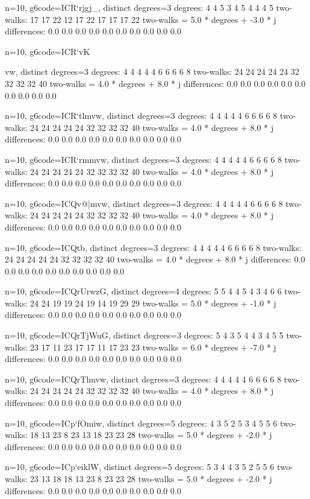 {{{{{{{{{{{{{{{{n=10, g6code=ICR`rjgj_, distinct degrees=3
degrees: 4 4 5 3 4 5 4 4 4 5 
two-walks: 17 17 22 12 17 22 17 17 17 22 
two-walks = 5.0 * degrees + -3.0 * j
differences: 0.0 0.0 0.0 0.0 0.0 0.0 0.0 0.0 0.0 0.0 

n=10, g6code=ICR`vK}vw, distinct degrees=3
degrees: 4 4 4 4 4 6 6 6 6 8 
two-walks: 24 24 24 24 24 32 32 32 32 40 
two-walks = 4.0 * degrees + 8.0 * j
differences: 0.0 0.0 0.0 0.0 0.0 0.0 0.0 0.0 0.0 0.0 

n=10, g6code=ICR`tlmvw, distinct degrees=3
degrees: 4 4 4 4 4 6 6 6 6 8 
two-walks: 24 24 24 24 24 32 32 32 32 40 
two-walks = 4.0 * degrees + 8.0 * j
differences: 0.0 0.0 0.0 0.0 0.0 0.0 0.0 0.0 0.0 0.0 

n=10, g6code=ICR`rmmvw, distinct degrees=3
degrees: 4 4 4 4 4 6 6 6 6 8 
two-walks: 24 24 24 24 24 32 32 32 32 40 
two-walks = 4.0 * degrees + 8.0 * j
differences: 0.0 0.0 0.0 0.0 0.0 0.0 0.0 0.0 0.0 0.0 

n=10, g6code=ICQv@|mvw, distinct degrees=3
degrees: 4 4 4 4 4 6 6 6 6 8 
two-walks: 24 24 24 24 24 32 32 32 32 40 
two-walks = 4.0 * degrees + 8.0 * j
differences: 0.0 0.0 0.0 0.0 0.0 0.0 0.0 0.0 0.0 0.0 

n=10, g6code=ICQtb\mvw, distinct degrees=3
degrees: 4 4 4 4 4 6 6 6 6 8 
two-walks: 24 24 24 24 24 32 32 32 32 40 
two-walks = 4.0 * degrees + 8.0 * j
differences: 0.0 0.0 0.0 0.0 0.0 0.0 0.0 0.0 0.0 0.0 

n=10, g6code=ICQrUrwzG, distinct degrees=4
degrees: 5 5 4 4 5 4 3 4 6 6 
two-walks: 24 24 19 19 24 19 14 19 29 29 
two-walks = 5.0 * degrees + -1.0 * j
differences: 0.0 0.0 0.0 0.0 0.0 0.0 0.0 0.0 0.0 0.0 

n=10, g6code=ICQrTjWuG, distinct degrees=3
degrees: 5 4 3 5 4 4 3 4 5 5 
two-walks: 23 17 11 23 17 17 11 17 23 23 
two-walks = 6.0 * degrees + -7.0 * j
differences: 0.0 0.0 0.0 0.0 0.0 0.0 0.0 0.0 0.0 0.0 

n=10, g6code=ICQrTlmvw, distinct degrees=3
degrees: 4 4 4 4 4 6 6 6 6 8 
two-walks: 24 24 24 24 24 32 32 32 32 40 
two-walks = 4.0 * degrees + 8.0 * j
differences: 0.0 0.0 0.0 0.0 0.0 0.0 0.0 0.0 0.0 0.0 

n=10, g6code=ICp`fOmiw, distinct degrees=5
degrees: 4 3 5 2 5 3 4 5 5 6 
two-walks: 18 13 23 8 23 13 18 23 23 28 
two-walks = 5.0 * degrees + -2.0 * j
differences: 0.0 0.0 0.0 0.0 0.0 0.0 0.0 0.0 0.0 0.0 

n=10, g6code=ICp`eiklW, distinct degrees=5
degrees: 5 3 4 4 3 5 2 5 5 6 
two-walks: 23 13 18 18 13 23 8 23 23 28 
two-walks = 5.0 * degrees + -2.0 * j
differences: 0.0 0.0 0.0 0.0 0.0 0.0 0.0 0.0 0.0 0.0 

}}}}}}}}}}}}}}}
